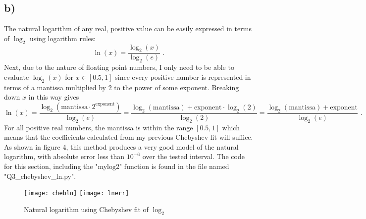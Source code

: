 \documentclass{article}
\newcommand{\<}[1]{\left\langle #1 \right\rangle }
\begin{document}
\subsection{b)}
The natural logarithm of any real, positive value can be easily expressed in terms of $\log_2$ using logarithm rules:
\[\ln(x) = \frac{\log_2(x)}{\log_2(e)}\text{ .}\]
Next, due to the nature of floating point numbers, I only need to be able to evaluate $\log_2(x)$ for $x \in [0.5, 1]$ since every positive number is represented in terms of a mantissa multiplied by 2 to the power of some exponent. Breaking down $x$ in this way gives
\[\ln(x) = \frac{\log_2(\text{mantissa}\cdot 2^{\text{exponent}})}{\log_2(e)} = \frac{\log_2(\text{mantissa}) + \text{exponent}\cdot\log_2(2)}{\log_2(2)} = \frac{\log_2(\text{mantissa}) + \text{exponent}}{\log_2(e)}\text{ .}\]
For all positive real numbers, the mantissa is within the range $[0.5, 1]$ which means that the coefficients calculated from my previous Chebyshev fit will suffice. As shown in figure 4, this method produces a very good model of the natural logarithm, with absolute error less than $10^{-6}$ over the tested interval. The code for this section, including the "mylog2" function is found in the file named "Q3\_chebyshev\_ln.py".
\begin{figure}[h]
	\caption{Natural logarithm using Chebyshev fit of $\log_2$}
	\centering
	\texttt{[image: chebln]}
	\texttt{[image: lnerr]}
\end{figure}
\end{document}
